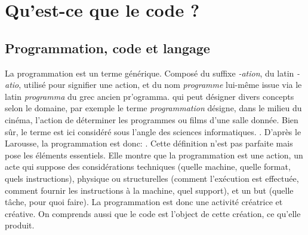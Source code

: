 \documentclass[12pt]{article} %
\begin{document}
\section{Qu'est-ce que le code ?}
\subsection{Programmation, code et langage}
La programmation est un terme générique. Composé du suffixe \textit{-ation}, du latin \textit{-atio}, utilisé pour signifier une action, et du nom \textit{programme} lui-même issue via le latin \textit{programma} du grec ancien \textgreek{pr'ogramma}.
qui peut désigner divers concepts selon le domaine, par exemple le terme \textit{programmation} désigne, dans le milieu du cinéma, l'action de déterminer les programmes ou films d'une salle donnée. Bien sûr, le terme est ici considéré sous l'angle des sciences informatiques.  \cite{Romero2017-mk}. D'après le Larousse, la programmation est donc: 
\cite{Nimmo2017-ya}. Cette définition n'est pas parfaite mais pose les éléments essentiels. Elle montre que la programmation est une action, un acte qui suppose des considérations techniques (quelle machine, quelle format, quels instructions), physique ou structurelles (comment l'exécution est effectuée, comment fournir les instructions à la machine, quel support), et un but (quelle tâche, pour quoi faire). La programmation est donc une activité créatrice et créative. On comprends aussi que le code est l'object de cette création, ce qu'elle produit.
\end{document}
